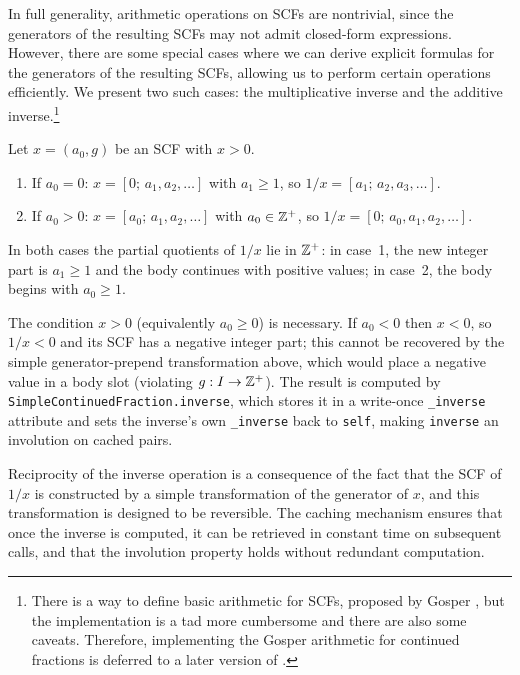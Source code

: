 In full generality, arithmetic operations on SCFs are nontrivial, since the
generators of the resulting SCFs may not admit closed-form expressions. However, there are some 
special cases where we can derive explicit formulas for the generators of the resulting SCFs, 
allowing us to perform certain operations efficiently. We present two such cases: the multiplicative 
inverse and the additive inverse.\footnote{
    There is a way to define basic arithmetic for SCFs, proposed by Gosper \cite{gosper1972}, but
    the implementation is a tad more cumbersome and there are also some caveats. Therefore, implementing
    the Gosper arithmetic for continued fractions is deferred to a later version of \catena.
}

\begin{proposition}
    \label{prop:inverse}
  Let $x = (a_0, g)$ be an SCF with $x > 0$.
  \begin{enumerate}
    \item If $a_0 = 0$: $x = [0;\, a_1, a_2, \ldots]$ with $a_1 \geq 1$, so
          $1/x = [a_1;\, a_2, a_3, \ldots]$.
    \item If $a_0 > 0$: $x = [a_0;\, a_1, a_2, \ldots]$ with $a_0 \in \mathbb{Z}^+$, so
          $1/x = [0;\, a_0, a_1, a_2, \ldots]$.
  \end{enumerate}
  In both cases the partial quotients of $1/x$ lie in $\mathbb{Z}^+$: in case~1, the
  new integer part is $a_1 \geq 1$ and the body continues with positive values;
  in case~2, the body begins with $a_0 \geq 1$.

  The condition $x > 0$ (equivalently $a_0 \geq 0$) is necessary.  If
  $a_0 < 0$ then $x < 0$, so $1/x < 0$ and its SCF has a negative integer
  part; this cannot be recovered by the simple generator-prepend transformation above,
  which would place a negative value in a body slot (violating $g: I \to \mathbb{Z}^+$).
  The result is computed by \texttt{SimpleContinuedFraction.inverse}, which
  stores it in a write-once \texttt{\_inverse} attribute and sets the
  inverse's own \texttt{\_inverse} back to \texttt{self}, making
  \texttt{inverse} an involution on cached pairs.
\end{proposition}

\begin{remark}
    Reciprocity of the inverse operation is a consequence of the fact that the SCF of $1/x$ is 
    constructed by a simple transformation of the generator of $x$, and this transformation is 
    designed to be reversible.  The caching mechanism ensures that once the inverse is computed, 
    it can be retrieved in constant time on subsequent calls, and that the involution property 
    holds without redundant computation.
\end{remark}

